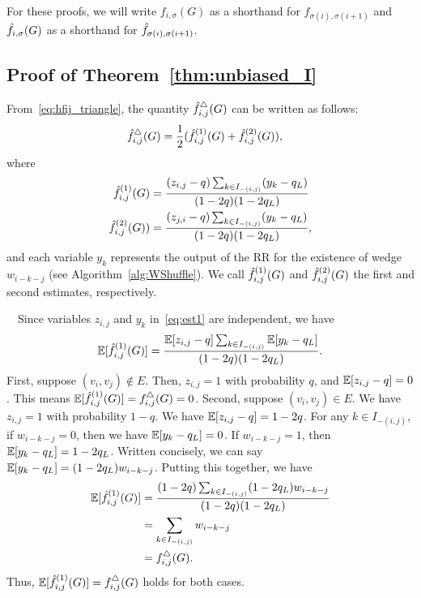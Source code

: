 For these proofs, we will write $f_{i,\sigma}(G)$ as a shorthand for
$f_{\sigma(i), \sigma(i+1)}$ and $\hat{f}_{i,\sigma}(G)$ as a shorthand for
$\hat{f}_{\sigma(i), \sigma(i+1)}$.

\subsection{Proof of Theorem~\ref{thm:unbiased_I}}
\label{sub:unbiased_I_proof}
    From~\eqref{eq:hfij_triangle}, the quantity $\hat{f}_{i,j}^\triangle(G)$ can be written as follows:
    \begin{align}
        \hat{f}_{i,j}^\triangle(G)
        &= \frac{1}{2} (\hat{f}_{i,j}^{(1)}(G) + \hat{f}_{i,j}^{(2)}(G)),
        \label{eq:est_decomp}
    \end{align}
    where
    \begin{align}
        \hat{f}_{i,j}^{(1)}(G)
        &= \frac{(z_{i,j}-q)\sum_{k \in I_{-(i,j)}} (y_{k} - q_L)}{(1-2q)(1-2q_L)} \label{eq:est1}\\
        \hat{f}_{i,j}^{(2)}(G))
        &= \frac{(z_{j,i}-q)\sum_{k \in I_{-(i,j)}} (y_{k} - q_L)}{(1-2q)(1-2q_L)}, \label{eq:est2}
    \end{align}
    and each variable $y_k$ represents the output of the RR for the existence of wedge $w_{i-k-j}$ (see Algorithm~\ref{alg:WShuffle}).
    We call $\hat{f}_{i,j}^{(1)}(G)$ and $\hat{f}_{i,j}^{(2)}(G)$ the first and second estimates, respectively.

    \smallskip
    ~~Since variables $z_{i,j}$ and $y_{k}$ in~\eqref{eq:est1} are independent, we have
    \begin{equation*}
        \operatorname{\mathbb{E}}[\hat{f}_{i,j}^{(1)}(G)] = \frac{\operatorname{\mathbb{E}}[z_{i,j}-q]\sum_{k \in I_{-(i,j)}}
        \operatorname{\mathbb{E}}[y_{k} - q_L]}{(1-2q)(1-2q_L)}.
    \end{equation*}
    First, suppose $(v_i,v_j) \notin E$. Then, $z_{i,j} = 1$ with probability $q$, and $\operatorname{\mathbb{E}}[z_{i,j} - q] = 0$. This means $\operatorname{\mathbb{E}}[\hat{f}_{i,j}^{(1)}(G)] = f_{i,j}^\triangle(G) = 0$.
    Second, suppose $(v_i,v_j) \in E$. We have $z_{i,j}=1$ with probability $1-q$.
    We have $\operatorname{\mathbb{E}}[z_{i,j} - q] = 1-2q$. For any $k \in I_{-(i,j)}$, if
    $w_{i-k-j} = 0$, then we have $\operatorname{\mathbb{E}}[y_{k} - q_L] = 0$. If
    $w_{i-k-j} = 1$, then $\operatorname{\mathbb{E}}[y_{k}-q_L] = 1-2q_L$. Written concisely, we
    can say $\operatorname{\mathbb{E}}[y_{k}-q_L] = (1-2q_L)w_{i-k-j}$. Putting this together, we have
    \begin{align*}
        \operatorname{\mathbb{E}}[\hat{f}_{i,j}^{(1)}(G)] &= \frac{(1-2q)\sum_{k \in
        I_{-(i,j)}}(1-2q_L)w_{i-k-j}}{(1-2q)(1-2q_L)} \\
        &= \sum_{k \in I_{-(i,j)}} w_{i-k-j} \\
        &= f_{i,j}^\triangle(G).
    \end{align*}
    Thus, $\operatorname{\mathbb{E}}[\hat{f}_{i,j}^{(1)}(G)] = f_{i,j}^\triangle(G)$ holds for both cases.


